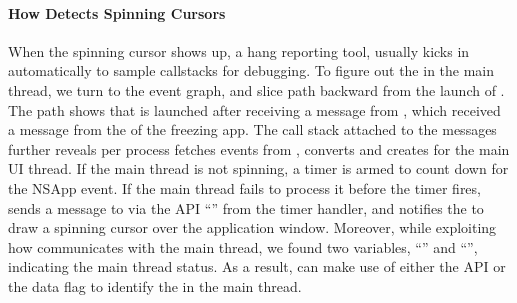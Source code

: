 
\paragraph{How \xxx Detects Spinning Cursors}
When the spinning cursor shows up, a hang reporting tool, \spindump usually
kicks in automatically to sample callstacks for debugging. To figure out the
\spinningnode in the main thread, we turn to the event graph, and slice path
backward from the launch of \spindump.
The path shows that \spindump is launched after receiving a message from
, which received a message from the  of
the freezing app. The call stack attached to the messages further reveals
 per process fetches  events from
, converts and creates  for the main UI
thread. If the main thread is not spinning, a timer is armed to count down
for the NSApp event. If the main thread fails to process it before the timer
fires,  sends a message to  via the API
``'' from the timer handler, and 
notifies the  to draw a spinning cursor over the application
window. Moreover, while exploiting how  communicates with
the main thread, we found two variables, ``'' and
``'', indicating the main thread status. As a
result, \xxx can make use of either the API or the data flag to identify the
\spinningnode in the main thread.
